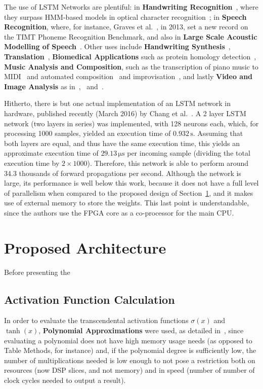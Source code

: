 \documentclass{IEEEtran}
\begin{document}
The use of LSTM Networks are plentiful: in \textbf{Handwriting Recognition}~\cite{ICDAR09}, where they surpass 
HMM-based models in optical character recognition~\cite{Breuel13}; in \textbf{Speech Recognition}, where, for 
instance, Graves et al.~\cite{Graves13}, in 2013, set a new record on the TIMT Phoneme Recognition Benchmark, 
and also in \textbf{Large Scale Acoustic Modelling of Speech}~\cite{Sak14}. Other uses include 
\textbf{Handwriting Synthesis}~\cite{Graves13_2}, \textbf{Translation}~\cite{Sustkever14}, \textbf{Biomedical Applications} such
as protein homology detection~\cite{Hochreiter07}, \textbf{Music Analysis and Composition}, such as the transcription of piano music 
to MIDI~\cite{Bock12} and automated composition~\cite{Coca13} and improvisation~\cite{Eck02}, and lastly \textbf{Video and Image Analysis} as
in~\cite{Vinyals14},~\cite{Donahue14} and~\cite{Donahue14_2}.

Hitherto, there is but one actual implementation of an LSTM network in hardware, published recently 
(March 2016) by Chang et al.~\cite{Chang15}. A 2 layer LSTM network (two layers in series) was implemented,
with 128 neurons each, which, for processing 1000 samples, yielded an execution time of $0.932 \, \si{\second}$. Assuming 
that both layers are equal, and thus have the same execution time, this yields an approximate execution time of 
$29.13 \, \si{\micro\second}$ per incoming sample (dividing the total execution time by $2 \times 1000$). 
Therefore, this network is able to perform around 34.3 thousands of forward propagations per second. 
Although the network is large, its performance is well below this work, because it does not have
a full level of parallelism when compared to the proposed design of Section~\ref{sec:proparch}, and it
makes use of external memory to store the weights. This last point is understandable, since the authors use
the FPGA core as a co-processor for the main CPU.


\section{Proposed Architecture}\label{sec:proparch}
Before presenting the 
\subsection{Activation Function Calculation}\label{sec:proprarch_af}
In order to evaluate the transcendental activation functions $\sigma(x)$ and $\tanh(x)$, \textbf{Polynomial Approximations} were used, as detailed in~\cite{Muller05}, since evaluating a polynomial does not have high memory usage needs (as opposed to Table Methods, for instance) and, if the polynomial degree is sufficiently low, the number of multiplications needed is low enough to not pose a restriction both on resources (now DSP slices, and not memory) and in speed (number of number of clock cycles needed to output a result).
\end{document}
